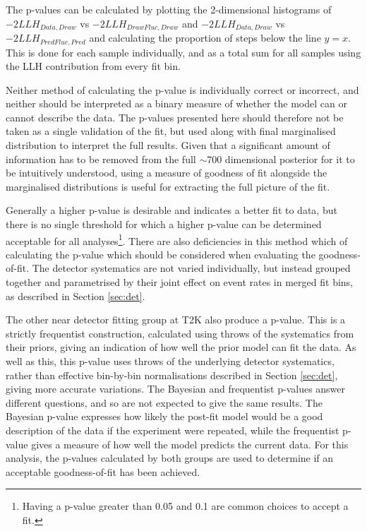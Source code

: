 The p-values can be calculated by plotting the 2-dimensional histograms of\\ $-2LLH_{Data, Draw}$ vs $-2LLH_{Draw Fluc, Draw}$ and $-2LLH_{Data, Draw}$ vs $-2LLH_{Pred Fluc, Pred}$ and calculating the proportion of steps below the line $y=x$. This is done for each sample individually, and as a total sum for all samples using the LLH contribution from every fit bin. 

Neither method of calculating the p-value is individually correct or incorrect, and neither should be interpreted as a binary measure of whether the model can or cannot describe the data. The p-values presented here should therefore not be taken as a single validation of the fit, but used along with final marginalised distribution to interpret the full results. Given that a significant amount of information has to be removed from the full $\sim$700 dimensional posterior for it to be intuitively understood, using a measure of goodness of fit alongside the marginalised distributions is useful for extracting the full picture of the fit.

Generally a higher p-value is desirable and indicates a better fit to data, but there is no single threshold for which a higher p-value can be determined acceptable for all analyses\footnote{Having a p-value greater than 0.05 and 0.1 are common choices to accept a fit.}. There are also deficiencies in this method which of calculating the p-value which should be considered when evaluating the goodness-of-fit. The detector systematics are not varied individually, but instead grouped together and parametrised by their joint effect on event rates in merged fit bins, as described in Section \ref{sec:det}.

The other near detector fitting group at T2K also produce a p-value. This is a strictly frequentist construction, calculated using throws of the systematics from their priors, giving an indication of how well the prior model can fit the data. As well as this, this p-value uses throws of the underlying detector systematics, rather than effective bin-by-bin normalisations described in Section \ref{sec:det}, giving more accurate variations. The Bayesian and frequentist p-values answer different questions, and so are not expected to give the same results. The Bayesian p-value expresses how likely the post-fit model would be a good description of the data if the experiment were repeated, while the frequentist p-value gives a measure of how well the model predicts the current data. For this analysis, the p-values calculated by both groups are used to determine if an acceptable goodness-of-fit has been achieved. 

\newpage